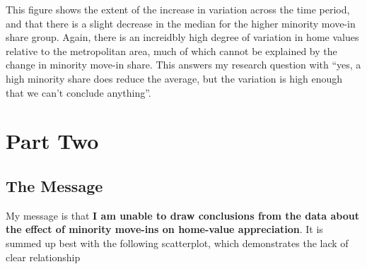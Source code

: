 \documentclass[11pt]{article}
\begin{document}
    This figure shows the extent of the increase in variation across the
time period, and that there is a slight decrease in the median for the
higher minority move-in share group. Again, there is an increidbly high
degree of variation in home values relative to the metropolitan area,
much of which cannot be explained by the change in minority move-in
share. This answers my research question with ``yes, a high minority
share does reduce the average, but the variation is high enough that we
can't conclude anything''.

    \section{Part Two}\label{part-two}

    \subsection{The Message}\label{the-message}

    My message is that \textbf{I am unable to draw conclusions from the data
about the effect of minority move-ins on home-value appreciation}. It is
summed up best with the following scatterplot, which demonstrates the
lack of clear relationship
\end{document}
